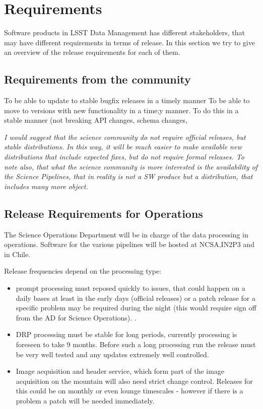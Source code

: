 \section{Requirements} \label{sec:reqs}

Software products in \gls{LSST} Data Management has different stakeholders, that may have different requirements in terms of release.
In this section we try to give an overview of the release requirements for each of them.


\subsection{Requirements from the community } \label{sec:comreqs}

To be able to update to stable bugfix releases in a timely manner
To be able to move to versions with new functionality in a time;y manner.
To do this in a stable manner (not breaking \gls{API} changes, schema changes,

\textit{ I would suggest that the science community do not require official releases, but stable distributions.
In this way, it will be much easier to make available new distributions that include expected fixes,
but do not require formal releases.
To note also, that what the science community is more interested is the availability of the Science Pipelines,
that in reality is not a \gls{SW} produce but a distribution, that includes many more object.  }

\subsection{Release Requirements for Operations} \label{sec:procreqs}

The Science Operations Department will be  in charge  of the data processing in operations. Software for the various pipelines
will be hosted at \gls{NCSA},IN2P3 and in Chile.

Release frequencies depend on the processing type:

\begin{itemize}
\item prompt processing must reposed quickly to issues, that could happen on a daily bases at least in the early days (official releases)
 or a  patch release  for a specific problem may be required during the night (this would require sign off from the \gls{AD} for Science Operations).  .
\item \gls{DRP} processing  must be stable for long periods, currently processing is foreseen to take 9 months.  Before such a long processing run the release must be very well tested and any updates extremely well controlled.
\item Image acquisition and header service, which form part of the image acquisition on the mountain will also need strict change control. Releases for this could be on monthly or even lounge timescales - however if there is a problem a patch will be needed immediately.
\end{itemize}

